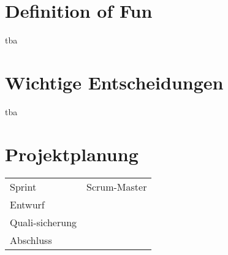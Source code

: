 \documentclass[titlepage]{scrartcl}
\begin{document}
\section{Definition of Fun}%
tba
\section{Wichtige Entscheidungen}
tba
\section{Projektplanung}%
\begin{tabular}{lc}
	Sprint & Scrum-Master\\
	Entwurf & \\
	Quali-sicherung & \\
	Abschluss & \\
\end{tabular}
\end{document}
